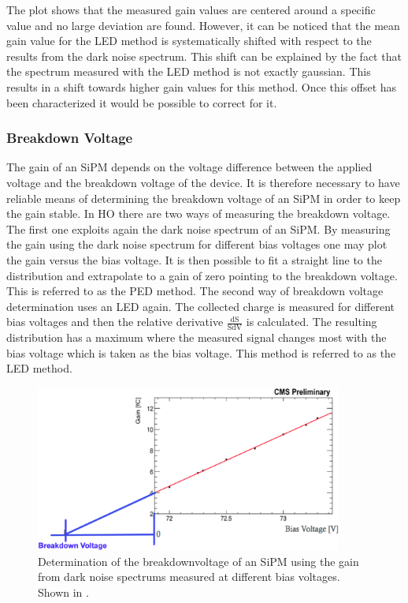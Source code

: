 The plot shows that the measured gain values are centered around a specific value and no large deviation are found. However, it can be noticed that the mean gain value for the LED method is systematically shifted with respect to the results from the dark noise spectrum. This shift can be explained by the fact that the spectrum measured with the LED method is not exactly gaussian. This results in a shift towards higher gain values for this method. Once this offset has been characterized it would be possible to correct for it.

\subsubsection{Breakdown Voltage}
The gain of an SiPM depends on the voltage difference between the applied voltage and the breakdown voltage of the device. It is therefore necessary to have reliable means of determining the breakdown voltage of an SiPM in order to keep the gain stable. In HO there are two ways of measuring the breakdown voltage. The first one exploits again the dark noise spectrum of an SiPM. By measuring the gain using the dark noise spectrum for different bias voltages one may plot the gain versus the bias voltage. It is then possible to fit a straight line to the distribution and extrapolate to a gain of zero pointing to the breakdown voltage. This is referred to as the PED method. The second way of breakdown voltage determination uses an LED again. The collected charge is measured for different bias voltages and then the relative derivative $\frac{\text{dS}}{\text{SdV}}$ is calculated. The resulting distribution has a maximum where the measured signal changes most with the bias voltage which is taken as the bias voltage. This method is referred to as the LED method.
\begin{figure}[bh]
\centering
\includegraphics[width=0.9\textwidth]{Figures/kuensken/bvPedDetermination.png}
\caption{Determination of the breakdownvoltage of an SiPM using the gain from dark noise spectrums measured at different bias voltages. Shown in \cite{kuenskenCalor}.}
\label{kuenskenbvPed}
\end{figure}
